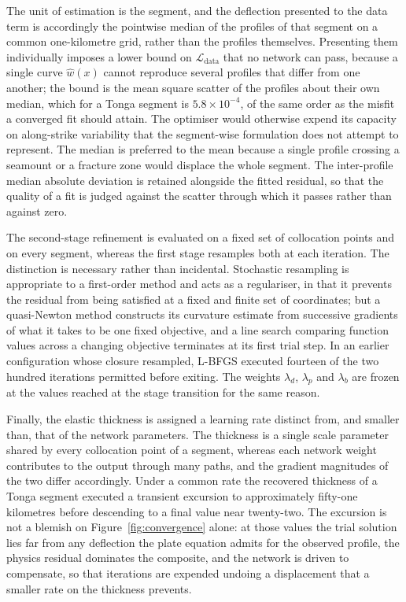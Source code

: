 \documentclass[final]{agujournal2019}
\begin{document}
The unit of estimation is the segment, and the deflection presented to the data
term is accordingly the pointwise median of the profiles of that segment on a
common one-kilometre grid, rather than the profiles themselves. Presenting them
individually imposes a lower bound on $\mathcal{L}_{\mathrm{data}}$ that no
network can pass, because a single curve $\hat{w}(x)$ cannot reproduce several
profiles that differ from one another; the bound is the mean square scatter of
the profiles about their own median, which for a Tonga segment is
$5.8 \times 10^{-4}$, of the same order as the misfit a converged fit should
attain. The optimiser would otherwise expend its capacity on along-strike
variability that the segment-wise formulation does not attempt to represent.
The median is preferred to the mean because a single profile crossing a
seamount or a fracture zone would displace the whole segment. The inter-profile
median absolute deviation is retained alongside the fitted residual, so that the
quality of a fit is judged against the scatter through which it passes rather
than against zero.

The second-stage refinement is evaluated on a fixed set of collocation points
and on every segment, whereas the first stage resamples both at each iteration.
The distinction is necessary rather than incidental. Stochastic resampling is
appropriate to a first-order method and acts as a regulariser, in that it
prevents the residual from being satisfied at a fixed and finite set of
coordinates; but a quasi-Newton method constructs its curvature estimate from
successive gradients of what it takes to be one fixed objective, and a line
search comparing function values across a changing objective terminates at its
first trial step. In an earlier configuration whose closure resampled, L-BFGS
executed fourteen of the two hundred iterations permitted before exiting. The
weights $\lambda_{d}$, $\lambda_{p}$ and $\lambda_{b}$ are frozen at the values
reached at the stage transition for the same reason.

Finally, the elastic thickness is assigned a learning rate distinct from, and
smaller than, that of the network parameters. The thickness is a single scale
parameter shared by every collocation point of a segment, whereas each network
weight contributes to the output through many paths, and the gradient
magnitudes of the two differ accordingly. Under a common rate the recovered
thickness of a Tonga segment executed a transient excursion to approximately
fifty-one kilometres before descending to a final value near twenty-two. The
excursion is not a blemish on Figure~\ref{fig:convergence} alone: at those
values the trial solution lies far from any deflection the plate equation admits
for the observed profile, the physics residual dominates the composite, and the
network is driven to compensate, so that iterations are expended undoing a
displacement that a smaller rate on the thickness prevents.
\end{document}

